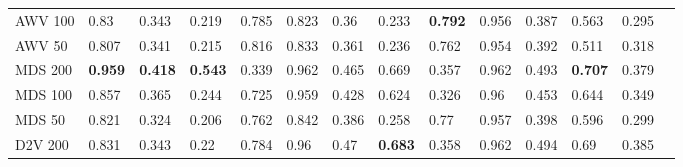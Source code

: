 \begin{landscape}
\begin{table}[]
\begin{tabular}{llllllllllllll}
AWV 100    & 0.83                            & 0.343                           & 0.219                           & 0.785                           & 0.823                           & 0.36                            & 0.233                           & \textbf{0.792} & 0.956                           & 0.387                           & 0.563                           & 0.295                           &                                 \\
AWV 50     & 0.807                           & 0.341                           & 0.215                           & 0.816                           & 0.833                           & 0.361                           & 0.236                           & 0.762                           & 0.954                           & 0.392                           & 0.511                           & 0.318                           &                                 \\
MDS 200    & \textbf{0.959} & \textbf{0.418} & \textbf{0.543} & 0.339                           & 0.962                           & 0.465                           & 0.669                           & 0.357                           & 0.962                           & 0.493                           & \textbf{0.707} & 0.379                           &                                 \\
MDS 100    & 0.857                           & 0.365                           & 0.244                           & 0.725                           & 0.959                           & 0.428                           & 0.624                           & 0.326                           & 0.96                            & 0.453                           & 0.644                           & 0.349                           &                                 \\
MDS 50     & 0.821                           & 0.324                           & 0.206                           & 0.762                           & 0.842                           & 0.386                           & 0.258                           & 0.77                            & 0.957                           & 0.398                           & 0.596                           & 0.299                           &                                 \\
D2V 200    & 0.831                           & 0.343                           & 0.22                            & 0.784                           & 0.96                            & 0.47                            & \textbf{0.683} & 0.358                           & 0.962                           & 0.494                           & 0.69                            & 0.385                           &                                 \\

\end{tabular}
\end{table}
\end{landscape}
